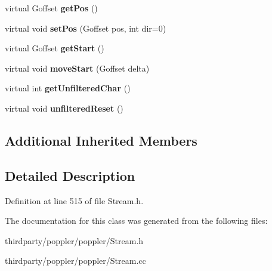 \begin{DoxyCompactItemize}
virtual Goffset {\bfseries get\+Pos} ()
\item 
\mbox{\label{class_cached_file_stream_a102fe2ebea00543ee314b76b6ab4ecc8}} 
virtual void {\bfseries set\+Pos} (Goffset pos, int dir=0)
\item 
\mbox{\label{class_cached_file_stream_a10fd12f084cfaf5d7511eac4804cc2fb}} 
virtual Goffset {\bfseries get\+Start} ()
\item 
\mbox{\label{class_cached_file_stream_a028546af4ab42ed2bdb0f39977eaf288}} 
virtual void {\bfseries move\+Start} (Goffset delta)
\item 
\mbox{\label{class_cached_file_stream_a42b05ab4cbff55b37559e74e6cb6483b}} 
virtual int {\bfseries get\+Unfiltered\+Char} ()
\item 
\mbox{\label{class_cached_file_stream_af9070ff19e8c5a83222d5e41b2fb7d66}} 
virtual void {\bfseries unfiltered\+Reset} ()
\end{DoxyCompactItemize}
\subsection*{Additional Inherited Members}


\subsection{Detailed Description}


Definition at line 515 of file Stream.\+h.



The documentation for this class was generated from the following files\+:\begin{DoxyCompactItemize}
\item 
thirdparty/poppler/poppler/Stream.\+h\item 
thirdparty/poppler/poppler/Stream.\+cc\end{DoxyCompactItemize}
